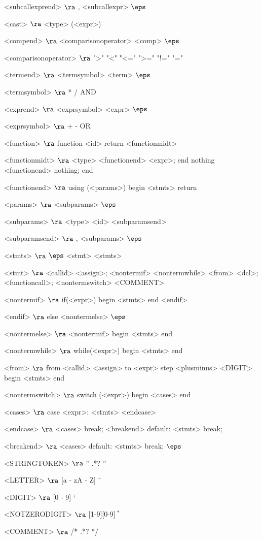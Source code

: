 \begin{grammar}
<subcallexprend> $\ra$ , <subcallexpr>
\alt$\eps$

<cast> $\ra$ <type> (<expr>)

<compend> $\ra$ <comparisonoperator> <comp>
\alt$\eps$

<comparisonoperator> $\ra$ ">"
				\alt "<"
				\alt "<="
				\alt ">="
				\alt "!="
				\alt "="

<termend> $\ra$ <termsymbol> <term>
\alt$\eps$

<termsymbol> $\ra$ *
\alt /
\alt AND 

<exprend> $\ra$ <exprsymbol> <expr>
\alt$\eps$

<exprsymbol> $\ra$ +
\alt -
\alt OR 

<function> $\ra$ function <id> return <functionmidt>

<functionmidt> $\ra$ <type> <functionend> <expr>; end
\alt nothing <functionend> nothing; end

<functionend> $\ra$
using (<params>)
begin
	<stmts>
	return

<params> $\ra$ <subparams>
	\alt$\eps$

<subparams> $\ra$ <type> <id> <subparamsend>

<subparamsend> $\ra$ , <subparams>
\alt$\eps$

<stmts> $\ra$ $\eps$
	\alt <stmt> <stmts>

<stmt> $\ra$ <callid> <assign>;
	\alt <nontermif>
	\alt <nontermwhile>
	\alt <from>
	\alt <dcl>;
	\alt <functioncall>;
	\alt <nontermswitch>
	\alt <COMMENT>
	
<nontermif> $\ra$ if(<expr>)
	begin
		<stmts>
	end
	<endif>

<endif> $\ra$ 
	else <nontermelse>
	\alt$\eps$

<nontermelse> $\ra$ <nontermif>
	\alt begin
		<stmts>
	end

<nontermwhile> $\ra$ while(<expr>)
		begin
			<stmts>
		end
		
<from> $\ra$ from <callid> <assign> to <expr> step <plusminus> <DIGIT>
	begin
		<stmts>
	end

<nontermswitch> $\ra$ switch (<expr>)
		begin
			<cases>
		end

<cases> $\ra$ case <expr>:
			<stmts>
		<endcase>
		
<endcase> $\ra$ <cases>
		\alt break; <breakend>
		\alt default:
			<stmts>
			break;

<breakend> $\ra$ <cases>
\alt default:
<stmts>
break;
\alt$\eps$

<STRINGTOKEN> $\ra$ '' .*? '' 

<LETTER> $\ra$ [a - zA - Z]$~^+$

<DIGIT> $\ra$ [0 - 9]$~^+$

<NOTZERODIGIT> $\ra$ [1-9][0-9]$~^*$

<COMMENT> $\ra$ /* .*? */


\end{grammar}